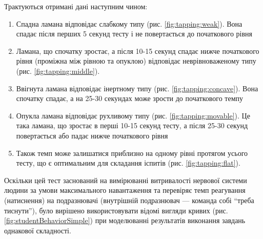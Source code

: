 Трактуються отримані дані наступним чином:
\begin{enumerate}
  \item Спадна ламана відповідає слабкому типу (рис. \ref{fig:tapping:weak}).
    Вона спадає після перших 5 секунд тесту і не повертається до початкового
    рівня
  \item Ламана, що спочатку зростає, а після 10-15 секунд спадає нижче
    початкового рівня (проміжна між рівною та опуклою) відповідає
    неврівноваженому типу (рис. \ref{fig:tapping:middle}).
  \item Ввігнута ламана відповідає інертному типу
    (рис. \ref{fig:tapping:concave}).
    Вона спочатку спадає, а на 25-30 секундах може зрости до початкового темпу
  \item Опукла ламана відповідає рухливому типу
    (рис. \ref{fig:tapping:movable}).
    Це така ламана, що зростає в перші 10-15 секунд тесту, а після 25-30
    секунд повертається або падає нижче початкового рівня
  \item Також темп може залишатися приблизно на одному рівні протягом
    усього тесту, що є оптимальним для складання іспитів
    (рис. \ref{fig:tapping:flat}).
\end{enumerate}

Оскільки цей тест заснований на вимірюванні витривалості нервової системи людини
за умови максимального навантаження та перевіряє темп реагування (натиснення) на
подразнювачі (внутрішній подразнювач --- команда собі ``треба тиснути''),
було вирішено використовувати відомі вигляди кривих
(рис. \ref{fig:studentBehaviorSimple}) при моделюванні результатів
виконання завдань однакової складності.

